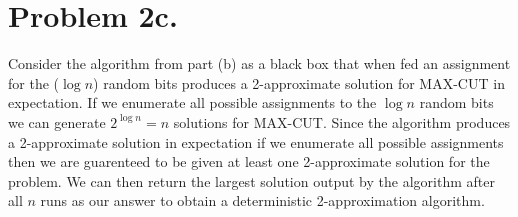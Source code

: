 \documentclass[12pt]{article}
\begin{document}
\section*{Problem 2c.}
Consider the algorithm from part (b) as a black box that when fed an
assignment for the ($\log n$) random bits produces a 2-approximate solution for
MAX-CUT in expectation. If we enumerate all possible assignments to the $\log n$
random bits we can generate $2^{\log n} = n$ solutions for MAX-CUT. Since the
algorithm produces a 2-approximate solution in expectation if we enumerate all
possible assignments then we are guarenteed to be given at least one
2-approximate solution for the problem. We can then return the largest solution
output by the algorithm after all $n$ runs as our answer to obtain a
deterministic 2-approximation algorithm.
\end{document}
